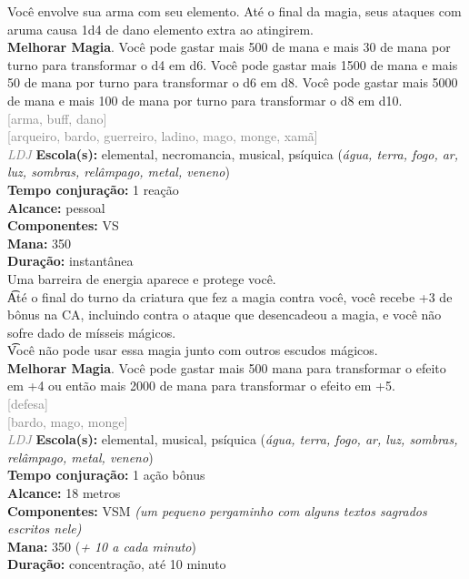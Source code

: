 \documentclass{RPG_Adventure}[2021/10/20]
\begin{document}
{\normalsize Você envolve sua arma com seu elemento. Até o final da magia, seus ataques com aruma causa 1d4 de dano elemento extra ao atingirem.\\\t \textbf{Melhorar Magia}. Você pode gastar mais 500 de mana e mais 30 de mana por turno para transformar o d4 em d6. Você pode gastar mais 1500 de mana e mais 50 de mana por turno para transformar o d6 em d8. Você pode gastar mais 5000 de mana e mais 100 de mana por turno para transformar o d8 em d10.\\}
{\scriptsize \textcolor{gray}{[arma, buff, dano]\\}}
{\scriptsize \textcolor{gray}{[arqueiro, bardo, guerreiro, ladino, mago, monge, xamã]\\}}
{\tiny \textcolor{gray}{\textit{LDJ}}}\jump{}
{\small \t \textbf{Escola(s):} elemental, necromancia, musical, psíquica (\textit{água, terra, fogo, ar, luz, sombras, relâmpago, metal, veneno})\\\t \textbf{Tempo conjuração:} 1 reação\\\t \textbf{Alcance:} pessoal\\\t \textbf{Componentes:} VS\\\t \textbf{Mana:} 350\\\t \textbf{Duração:} instantânea\\}
{\normalsize Uma barreira de energia aparece e protege você.\\\t Até o final do turno da criatura que fez a magia contra você, você recebe +3 de bônus na CA, incluindo contra o ataque que desencadeou a magia, e você não sofre dado de mísseis mágicos.\\\t Você não pode usar essa magia junto com outros escudos mágicos.\\\t \textbf{Melhorar Magia}. Você pode gastar mais 500 mana para transformar o efeito em +4 ou então mais 2000 de mana para transformar o efeito em +5.\\}
{\scriptsize \textcolor{gray}{[defesa]\\}}
{\scriptsize \textcolor{gray}{[bardo, mago, monge]\\}}
{\tiny \textcolor{gray}{\textit{LDJ}}}\jump{}
{\small \t \textbf{Escola(s):} elemental, musical, psíquica (\textit{água, terra, fogo, ar, luz, sombras, relâmpago, metal, veneno})\\\t \textbf{Tempo conjuração:} 1 ação bônus\\\t \textbf{Alcance:} 18 metros\\\t \textbf{Componentes:} VSM \textit{(um pequeno pergaminho com alguns textos sagrados escritos nele)}\\\t \textbf{Mana:} 350 (\textit{+ 10 a cada minuto})\\\t \textbf{Duração:} concentração, até 10 minuto\\}
\end{document}
